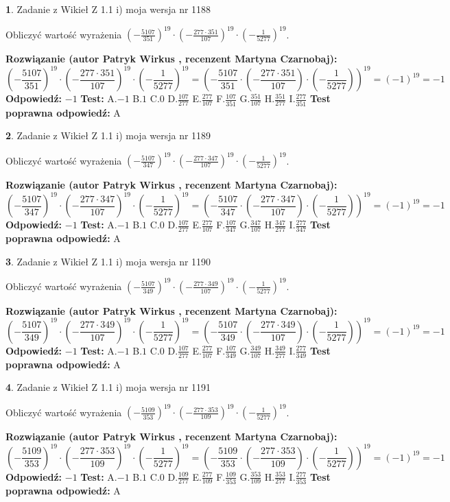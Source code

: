 \documentclass[12pt, a4paper]{article}
\theoremstyle{definition} %
\newtheorem{zad}{}
\newcommand{\zadStart}[1]{\begin{zad}#1\newline}
\newcommand{\zadStop}{\end{zad}}
\newcommand{\rozwStart}[2]{\noindent \textbf{Rozwiązanie (autor #1 , recenzent #2): }\newline}
\newcommand{\rozwStop}{\newline}
\newcommand{\odpStart}{\noindent \textbf{Odpowiedź:}\newline}
\newcommand{\odpStop}{\newline}
\newcommand{\testStart}{\noindent \textbf{Test:}\newline}
\newcommand{\testStop}{\newline}
\newcommand{\kluczStart}{\noindent \textbf{Test poprawna odpowiedź:}\newline}
\newcommand{\kluczStop}{\newline}
\begin{document}
\zadStart{Zadanie z Wikieł Z 1.1 i) moja wersja nr 1188}

Obliczyć wartość wyrażenia $(-\frac{5107}{351})^{19} \cdot (-\frac{277 \cdot 351}{107})^{19} \cdot (-\frac{1}{5277})^{19}$.
\zadStop
\rozwStart{Patryk Wirkus}{Martyna Czarnobaj}
$$(-\frac{5107}{351})^{19} \cdot (-\frac{277 \cdot 351}{107})^{19} \cdot (-\frac{1}{5277})^{19} = (-\frac{5107}{351} \cdot (-\frac{277 \cdot 351}{107}) \cdot (-\frac{1}{5277}))^{19} = (-1)^{19} = -1$$
\rozwStop
\odpStart
$-1$
\odpStop
\testStart
A.$-1$ B.$1$ C.$0$ D.$\frac{107}{277}$ E.$\frac{277}{107}$
F.$\frac{107}{351}$ G.$\frac{351}{107}$
H.$\frac{351}{277}$
I.$\frac{277}{351}$
\testStop
\kluczStart
A
\kluczStop



\zadStart{Zadanie z Wikieł Z 1.1 i) moja wersja nr 1189}

Obliczyć wartość wyrażenia $(-\frac{5107}{347})^{19} \cdot (-\frac{277 \cdot 347}{107})^{19} \cdot (-\frac{1}{5277})^{19}$.
\zadStop
\rozwStart{Patryk Wirkus}{Martyna Czarnobaj}
$$(-\frac{5107}{347})^{19} \cdot (-\frac{277 \cdot 347}{107})^{19} \cdot (-\frac{1}{5277})^{19} = (-\frac{5107}{347} \cdot (-\frac{277 \cdot 347}{107}) \cdot (-\frac{1}{5277}))^{19} = (-1)^{19} = -1$$
\rozwStop
\odpStart
$-1$
\odpStop
\testStart
A.$-1$ B.$1$ C.$0$ D.$\frac{107}{277}$ E.$\frac{277}{107}$
F.$\frac{107}{347}$ G.$\frac{347}{107}$
H.$\frac{347}{277}$
I.$\frac{277}{347}$
\testStop
\kluczStart
A
\kluczStop



\zadStart{Zadanie z Wikieł Z 1.1 i) moja wersja nr 1190}

Obliczyć wartość wyrażenia $(-\frac{5107}{349})^{19} \cdot (-\frac{277 \cdot 349}{107})^{19} \cdot (-\frac{1}{5277})^{19}$.
\zadStop
\rozwStart{Patryk Wirkus}{Martyna Czarnobaj}
$$(-\frac{5107}{349})^{19} \cdot (-\frac{277 \cdot 349}{107})^{19} \cdot (-\frac{1}{5277})^{19} = (-\frac{5107}{349} \cdot (-\frac{277 \cdot 349}{107}) \cdot (-\frac{1}{5277}))^{19} = (-1)^{19} = -1$$
\rozwStop
\odpStart
$-1$
\odpStop
\testStart
A.$-1$ B.$1$ C.$0$ D.$\frac{107}{277}$ E.$\frac{277}{107}$
F.$\frac{107}{349}$ G.$\frac{349}{107}$
H.$\frac{349}{277}$
I.$\frac{277}{349}$
\testStop
\kluczStart
A
\kluczStop



\zadStart{Zadanie z Wikieł Z 1.1 i) moja wersja nr 1191}

Obliczyć wartość wyrażenia $(-\frac{5109}{353})^{19} \cdot (-\frac{277 \cdot 353}{109})^{19} \cdot (-\frac{1}{5277})^{19}$.
\zadStop
\rozwStart{Patryk Wirkus}{Martyna Czarnobaj}
$$(-\frac{5109}{353})^{19} \cdot (-\frac{277 \cdot 353}{109})^{19} \cdot (-\frac{1}{5277})^{19} = (-\frac{5109}{353} \cdot (-\frac{277 \cdot 353}{109}) \cdot (-\frac{1}{5277}))^{19} = (-1)^{19} = -1$$
\rozwStop
\odpStart
$-1$
\odpStop
\testStart
A.$-1$ B.$1$ C.$0$ D.$\frac{109}{277}$ E.$\frac{277}{109}$
F.$\frac{109}{353}$ G.$\frac{353}{109}$
H.$\frac{353}{277}$
I.$\frac{277}{353}$
\testStop
\kluczStart
A
\kluczStop
\end{document}
